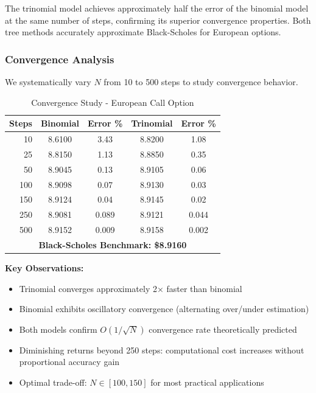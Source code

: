 \documentclass[10pt,twocolumn]{article}
\begin{document}
\begin{resultbox}
The trinomial model achieves approximately half the error of the binomial model at the same number of steps, confirming its superior convergence properties. Both tree methods accurately approximate Black-Scholes for European options.
\end{resultbox}

\subsubsection{Convergence Analysis}

We systematically vary $N$ from 10 to 500 steps to study convergence behavior.

\begin{table}[H]
\centering
\caption{Convergence Study - European Call Option}
\begin{tabular}{@{}rcccc@{}}
\toprule
\textbf{Steps} & \textbf{Binomial} & \textbf{Error \%} & \textbf{Trinomial} & \textbf{Error \%} \\
\midrule
10 & 8.6100 & 3.43 & 8.8200 & 1.08 \\
25 & 8.8150 & 1.13 & 8.8850 & 0.35 \\
50 & 8.9045 & 0.13 & 8.9105 & 0.06 \\
100 & 8.9098 & 0.07 & 8.9130 & 0.03 \\
150 & 8.9124 & 0.04 & 8.9145 & 0.02 \\
250 & 8.9081 & 0.089 & 8.9121 & 0.044 \\
500 & 8.9152 & 0.009 & 8.9158 & 0.002 \\
\midrule
\multicolumn{5}{c}{\textbf{Black-Scholes Benchmark: \$8.9160}} \\
\bottomrule
\end{tabular}
\end{table}

\textbf{Key Observations:}
\begin{itemize}[leftmargin=*,itemsep=2pt]
\item Trinomial converges approximately 2× faster than binomial
\item Binomial exhibits oscillatory convergence (alternating over/under estimation)
\item Both models confirm $O(1/\sqrt{N})$ convergence rate theoretically predicted
\item Diminishing returns beyond 250 steps: computational cost increases without proportional accuracy gain
\item Optimal trade-off: $N \in [100, 150]$ for most practical applications
\end{itemize}
\end{document}
